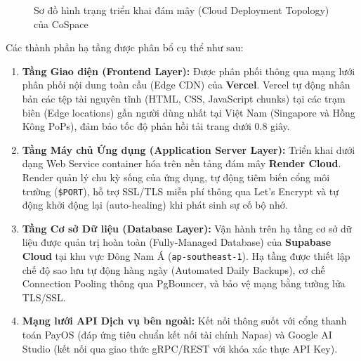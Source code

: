\begin{figure}[H]
\caption{Sơ đồ hình trạng triển khai đám mây (Cloud Deployment Topology) của CoSpace}
\label{fig:deployment-topology}
\end{figure}

Các thành phần hạ tầng được phân bổ cụ thể như sau:
\begin{enumerate}
    \item \textbf{Tầng Giao diện (Frontend Layer):} Được phân phối thông qua mạng lưới phân phối nội dung toàn cầu (Edge CDN) của \textbf{Vercel}. Vercel tự động nhân bản các tệp tài nguyên tĩnh (HTML, CSS, JavaScript chunks) tại các trạm biên (Edge locations) gần người dùng nhất tại Việt Nam (Singapore và Hồng Kông PoPs), đảm bảo tốc độ phản hồi tải trang dưới 0.8 giây.
    \item \textbf{Tầng Máy chủ Ứng dụng (Application Server Layer):} Triển khai dưới dạng Web Service container hóa trên nền tảng đám mây \textbf{Render Cloud}. Render quản lý chu kỳ sống của ứng dụng, tự động tiêm biến cổng môi trường (\texttt{\$PORT}), hỗ trợ SSL/TLS miễn phí thông qua Let's Encrypt và tự động khởi động lại (auto-healing) khi phát sinh sự cố bộ nhớ.
    \item \textbf{Tầng Cơ sở Dữ liệu (Database Layer):} Vận hành trên hạ tầng cơ sở dữ liệu được quản trị hoàn toàn (Fully-Managed Database) của \textbf{Supabase Cloud} tại khu vực Đông Nam Á (\texttt{ap-southeast-1}). Hạ tầng được thiết lập chế độ sao lưu tự động hàng ngày (Automated Daily Backups), cơ chế Connection Pooling thông qua PgBouncer, và bảo vệ mạng bằng tường lửa TLS/SSL.
    \item \textbf{Mạng lưới API Dịch vụ bên ngoài:} Kết nối thông suốt với cổng thanh toán PayOS (đáp ứng tiêu chuẩn kết nối tài chính Napas) và Google AI Studio (kết nối qua giao thức gRPC/REST với khóa xác thực API Key).
\end{enumerate}

